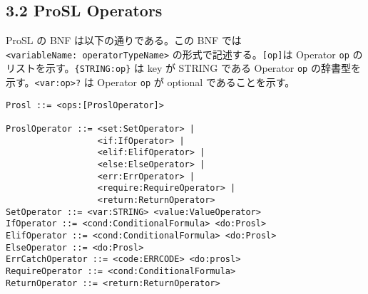 \hypertarget{prosl-operators}{%
\subsection{3.2 ProSL Operators}\label{prosl-operators}}

ProSL の BNF は以下の通りである。この BNF では
\texttt{\textless{}variableName:\ operatorTypeName\textgreater{}}
の形式で記述する。\texttt{{[}op{]}}は Operator \texttt{op}
のリストを示す。\texttt{\{STRING:op\}} は key が STRING である Operator
\texttt{op} の辞書型を示す。\texttt{\textless{}var:op\textgreater{}?} は
Operator \texttt{op} が optional であることを示す。

\begin{verbatim}
Prosl ::= <ops:[ProslOperator]>

ProslOperator ::= <set:SetOperator> |
                  <if:IfOperator> |
                  <elif:ElifOperator> |
                  <else:ElseOperator> |
                  <err:ErrOperator> |
                  <require:RequireOperator> |
                  <return:ReturnOperator>
SetOperator ::= <var:STRING> <value:ValueOperator>
IfOperator ::= <cond:ConditionalFormula> <do:Prosl>
ElifOperator ::= <cond:ConditionalFormula> <do:Prosl>
ElseOperator ::= <do:Prosl>
ErrCatchOperator ::= <code:ERRCODE> <do:prosl>
RequireOperator ::= <cond:ConditionalFormula>
ReturnOperator ::= <return:ReturnOperator>


\end{verbatim}
